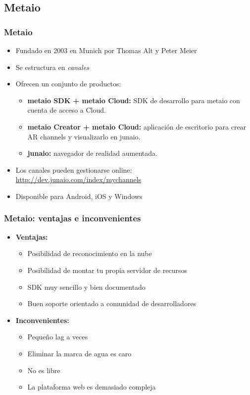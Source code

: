 \subsection*{Metaio}
\frame
{
\frametitle{Metaio}
\begin{itemize}
 \item Fundado en 2003 en Munich por Thomas Alt y Peter Meier
 \item Se estructura en \textit{canales}
 \item Ofrecen un conjunto de productos:
 \begin{itemize}
   \item \textbf{metaio SDK + metaio Cloud:} SDK de desarrollo para metaio con cuenta de acceso a Cloud. 
   \item \textbf{metaio Creator + metaio Cloud:} aplicación de escritorio para crear AR channels y visualizarlo en junaio.
   \item \textbf{junaio:} navegador de realidad aumentada.
 \end{itemize}
 \item Los canales pueden gestionarse online: \\
   \url{http://dev.junaio.com/index/mychannels}
 \item Disponible para Android, iOS y Windows
\end{itemize}
}

\frame
{
\frametitle{Metaio: ventajas e inconvenientes}
\begin{itemize}
\item \textbf{Ventajas:}
  \begin{itemize}
   \item Posibilidad de reconocimiento en la nube
   \item Posibilidad de montar tu propia servidor de recursos
   \item SDK muy sencillo y bien documentado
   \item Buen soporte orientado a comunidad de desarrolladores
  \end{itemize}

\item \textbf{Inconvenientes:}
  \begin{itemize}
   \item Pequeño lag a veces
   \item Eliminar la marca de agua es caro
   \item No es libre
   \item La plataforma web es demasiado compleja 
  \end{itemize}

\end{itemize}
}

